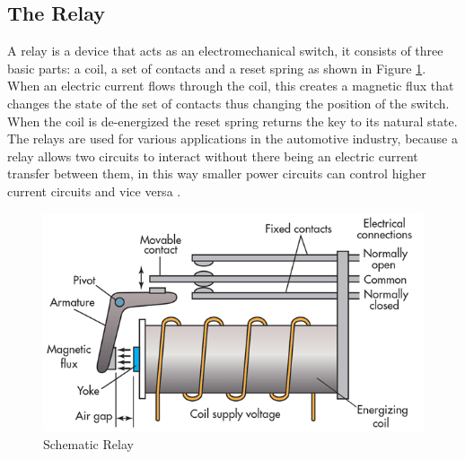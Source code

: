 \subsection{The Relay}\label{ssec:relay}
	A relay is a device that acts as an electromechanical switch, it consists of three basic parts: a coil, a set of contacts and a reset spring as shown in Figure \ref{fig:relay}. When an electric current flows through the coil, this creates a magnetic flux that changes the state of the set of contacts thus changing the position of the switch. When the coil is de-energized the reset spring returns the key to its natural state. The relays are used for various applications in the automotive industry, because a relay allows two circuits to interact without there being an electric current transfer between them, in this way smaller power circuits can control higher current circuits and vice versa \cite{keller1962relays} .

	\begin{figure}[htbp]
		\centering
			\includegraphics[scale=0.45]{figuras/fig-relay.png}
			\caption{Schematic Relay \cite{relay-scheme}}
		\label{fig:relay}
	\end{figure}
